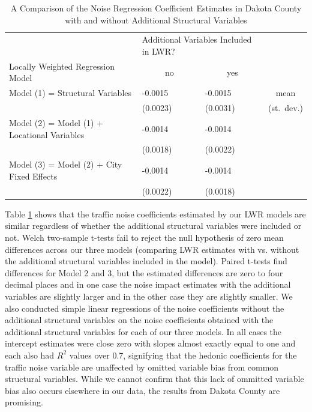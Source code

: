 \documentclass{article}\usepackage{graphicx, color}
\begin{document}
\begin{table}[ht]
\begin{center}
\caption{A Comparison of the Noise Regression Coefficient Estimates in Dakota County with and without Additional Structural Variables}\label{tab:Dak}
\begin{tabular}{lllc}
 & \multicolumn{2}{p{1.25in}}{Additional Variables Included in LWR?} & \\
Locally Weighted Regression Model & \multicolumn{1}{c}{no} & \multicolumn{1}{c}{yes} & \\ \cline{1-3}
Model (1) = Structural Variables & -0.0015 & -0.0015 & mean\\ 
   & (0.0023) & (0.0031) & (st.\ dev.) \\ 
Model (2) = Model (1) + Locational Variables & -0.0014 & -0.0014  & \\ 
   & (0.0018) & (0.0022) &  \\ 
Model (3) = Model (2) + City Fixed Effects & -0.0014 & -0.0014 & \\ 
   & (0.0022) & (0.0018) & \\ 
\end{tabular}
\end{center}
\end{table}

Table \ref{tab:Dak} shows that the traffic noise coefficients estimated by our LWR models are similar regardless of whether the additional structural variables were included or not. Welch two-sample t-tests fail to reject the null hypothesis of zero mean differences across our three models (comparing LWR estimates with vs. without the additional structural variables included in the model). Paired t-tests find differences for Model 2 and 3, but the estimated differences are zero to four decimal places and in one case the noise impact estimates with the additional variables are slightly larger and in the other case they are slightly smaller. We also conducted simple linear regressions of the noise coefficients without the additional structural variables on the noise coefficients obtained with the additional structural variables for each of our three models. In all cases the intercept estimates were close zero with slopes almost exactly equal to one and each also had $R^2$ values over 0.7, signifying that the hedonic coefficients for the traffic noise variable are unaffected by omitted variable bias from common structural variables. While we cannot confirm that this lack of ommitted variable bias also occurs elsewhere in our data, the results from Dakota County are promising. 
\end{document}
